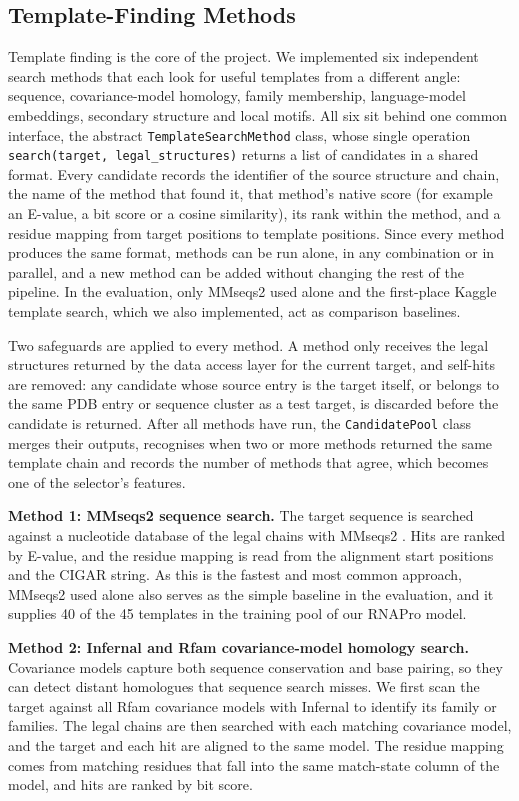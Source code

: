 \documentclass{FastFyp}
\begin{document}
\subsection{Template-Finding Methods}
\label{sec:impl-search}
Template finding is the core of the project. We implemented six independent search methods that each look for useful templates from a different angle: sequence, covariance-model homology, family membership, language-model embeddings, secondary structure and local motifs. All six sit behind one common interface, the abstract \texttt{TemplateSearchMethod} class, whose single operation \texttt{search(target, legal\_structures)} returns a list of candidates in a shared format. Every candidate records the identifier of the source structure and chain, the name of the method that found it, that method's native score (for example an E-value, a bit score or a cosine similarity), its rank within the method, and a residue mapping from target positions to template positions. Since every method produces the same format, methods can be run alone, in any combination or in parallel, and a new method can be added without changing the rest of the pipeline. In the evaluation, only MMseqs2 used alone and the first-place Kaggle template search, which we also implemented, act as comparison baselines.

Two safeguards are applied to every method. A method only receives the legal structures returned by the data access layer for the current target, and self-hits are removed: any candidate whose source entry is the target itself, or belongs to the same PDB entry or sequence cluster as a test target, is discarded before the candidate is returned. After all methods have run, the \texttt{CandidatePool} class merges their outputs, recognises when two or more methods returned the same template chain and records the number of methods that agree, which becomes one of the selector's features.

\textbf{Method 1: MMseqs2 sequence search.} The target sequence is searched against a nucleotide database of the legal chains with MMseqs2 \cite{steinegger2017}. Hits are ranked by E-value, and the residue mapping is read from the alignment start positions and the CIGAR string. As this is the fastest and most common approach, MMseqs2 used alone also serves as the simple baseline in the evaluation, and it supplies 40 of the 45 templates in the training pool of our RNAPro model.

\textbf{Method 2: Infernal and Rfam covariance-model homology search.} Covariance models capture both sequence conservation and base pairing, so they can detect distant homologues that sequence search misses. We first scan the target against all Rfam \cite{kalvari2018} covariance models with Infernal \cite{nawrocki2013} to identify its family or families. The legal chains are then searched with each matching covariance model, and the target and each hit are aligned to the same model. The residue mapping comes from matching residues that fall into the same match-state column of the model, and hits are ranked by bit score.
\end{document}
